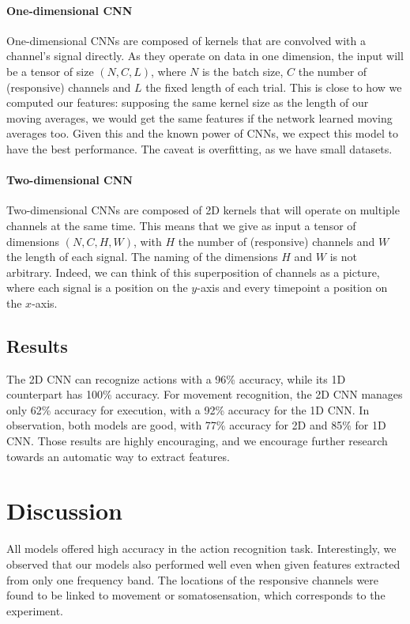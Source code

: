 \documentclass[10pt,conference,compsocconf]{IEEEtran}
\begin{document}
\paragraph{One-dimensional CNN}
One-dimensional CNNs are composed of kernels that are convolved with a channel's signal directly. As they operate on data in one dimension, the input will be a tensor of size \((N, C, L)\), where \(N\) is the batch size, \(C\) the number of (responsive) channels and \(L\) the fixed length of each trial. This is close to how we computed our features: supposing the same kernel size as the length of our moving averages, we would get the same features if the network learned moving averages too. Given this and the known power of CNNs, we expect this model to have the best performance. The caveat is overfitting, as we have small datasets.

\paragraph{Two-dimensional CNN}
Two-dimensional CNNs are composed of 2D kernels that will operate on multiple channels at the same time. This means that we give as input a tensor of dimensions \((N, C, H, W)\), with \(H\) the number of (responsive) channels and \(W\) the length of each signal. The naming of the dimensions \(H\) and \(W\) is not arbitrary. Indeed, we can think of this superposition of channels as a picture, where each signal is a position on the \(y\)-axis and every timepoint a position on the \(x\)-axis.

\subsection{Results}
The 2D CNN can recognize actions with a 96\% accuracy, while its 1D counterpart has 100\% accuracy. For movement recognition, the 2D CNN manages only 62\% accuracy for execution, with a 92\% accuracy for the 1D CNN. In observation, both models are good, with 77\% accuracy for 2D and 85\% for 1D CNN. Those results are highly encouraging, and we encourage further research towards an automatic way to extract features.

\section{Discussion}
\label{sec:discussion}
All models offered high accuracy in the action recognition task. Interestingly, we observed that our models also performed well even when given features extracted from only one frequency band. The locations of the responsive channels were found to be linked to movement or somatosensation, which corresponds to the experiment.
\end{document}
